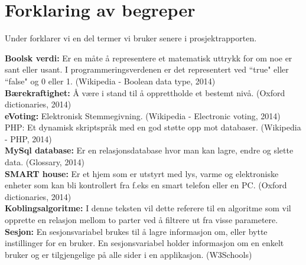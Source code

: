 \section*{Forklaring av begreper}

Under forklarer vi en del termer vi bruker senere i prosjektrapporten.

{\bf Boolsk verdi:} Er en måte å representere et matematisk uttrykk for om noe er sant eller usant. I programmeringsverdenen er det representert ved ``true" eller ``false" og 0 eller 1. (Wikipedia - Boolean data type, 2014)\cite{website:wiki_boolean}\\

{\bf Bærekraftighet:} Å være i stand til å opprettholde et bestemt nivå. (Oxford dictionaries, 2014)\cite{website:sustainable}\\

{\bf eVoting:} Elektronisk Stemmegivning. (Wikipedia - Electronic voting, 2014)
PHP:  Et dynamisk skriptspråk med en god støtte opp mot databaser. (Wikipedia - PHP, 2014)\cite{website:wiki_evoting}\\

{\bf MySql database:} Er en relasjonsdatabase hvor man kan lagre, endre og slette data. (Glossary, 2014)\\

{\bf SMART house:} Er et hjem som er utstyrt med lys, varme og elektroniske enheter som kan bli kontrollert fra f.eks en smart telefon eller en PC. (Oxford dictionaries, 2014)\cite{website:smarthome}\\

{\bf Koblingsalgoritme:}  I denne teksten vil dette referere til en algoritme som vil opprette en relasjon mellom to parter ved å filtrere ut fra visse parametere.\\

{\bf Sesjon:} En sesjonsvariabel brukes til å lagre informasjon om, eller bytte instillinger for en bruker. En sesjonsvariabel holder informasjon om en enkelt bruker og er tilgjengelige på alle sider i en applikasjon. (W3Schools)\cite{website:sessionvariable}
